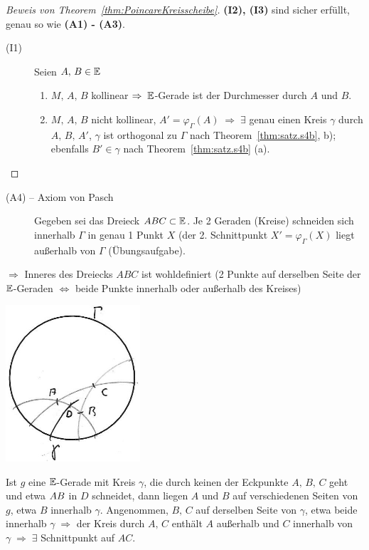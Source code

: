 \begin{proof}[Beweis von Theorem~\ref{thm:PoincareKreisscheibe}]
    {\bf (I2), (I3)} sind sicher erfüllt, genau so wie {\bf (A1) - (A3)}. %
    \begin{description}
        \item[(I1)] Seien $A,\, B \in \mathbb E$
            \begin{enumerate}
                \item $M,\, A,\, B$ kollinear $\Rightarrow\; \mathbb E$-Gerade ist der Durchmesser durch
                    $A$ und $B$.

                \item $M,\, A,\, B$ nicht kollinear, $A' = \varphi_\Gamma(A)\; \Rightarrow\;
                    \exists$ genau einen Kreis $\gamma$ durch $A,\, B,\, A'$, $\gamma$ ist
                    orthogonal zu $\Gamma$ nach Theorem~\ref{thm:satz.s4b}, b); ebenfalls $B' \in
                    \gamma$ nach Theorem~\ref{thm:satz.s4b} (a).
            \end{enumerate}
    \end{description}
\end{proof}

\begin{description}
    \item[(A4) -- Axiom von Pasch] Gegeben sei das Dreieck $ABC\subset\mathbb E$. Je 2 Geraden (Kreise)
        schneiden sich innerhalb $\Gamma$ in genau 1 Punkt $X$ (der 2. Schnittpunkt $X' =
        \varphi_\Gamma(X)$ liegt außerhalb von $\Gamma$ (Übungsaufgabe).
\end{description}

$\Rightarrow$ Inneres des Dreiecks $ABC$ ist wohldefiniert (2 Punkte auf derselben Seite der
$\mathbb E$-Geraden $\Longleftrightarrow$ beide Punkte innerhalb oder außerhalb des Kreises)

\centerline{\includegraphics[width=5cm]{BILDER/4-2-08-Pasch.jpg}}

Ist $g$ eine $\mathbb E$-Gerade mit Kreis $\gamma$, die durch keinen der Eckpunkte $A,\, B,\, C$ geht und
etwa ${AB}$ in $D$ schneidet, dann liegen $A$ und $B$ auf verschiedenen Seiten von $g$, etwa $B$
innerhalb $\gamma$. Angenommen, $B,\, C$ auf derselben Seite von $\gamma$, etwa beide innerhalb
$\gamma\; \Rightarrow$ der Kreis durch $A,\, C$ enthält $A$ außerhalb und $C$ innerhalb von
$\gamma\; \Rightarrow\; \exists$ Schnittpunkt auf $AC$.

